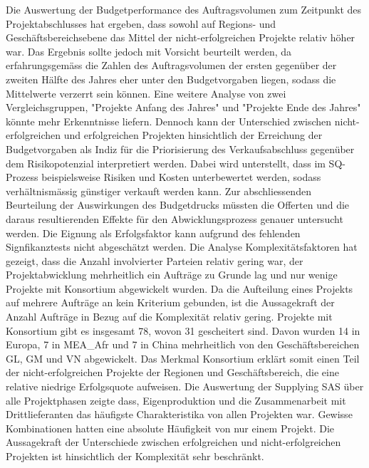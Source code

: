 Die Auswertung der Budgetperformance des Auftragsvolumen zum Zeitpunkt des Projektabschlusses hat ergeben, dass sowohl auf Regions- und Geschäftsbereichsebene das Mittel der nicht-erfolgreichen Projekte relativ höher war. Das Ergebnis sollte jedoch mit Vorsicht beurteilt werden, da erfahrungsgemäss die Zahlen des Auftragsvolumen der ersten gegenüber der zweiten Hälfte des Jahres eher unter den Budgetvorgaben liegen, sodass die Mittelwerte verzerrt sein können. Eine weitere Analyse von zwei Vergleichsgruppen, "Projekte Anfang des Jahres" und "Projekte Ende des Jahres" könnte mehr Erkenntnisse liefern. Dennoch kann der Unterschied zwischen nicht-erfolgreichen und erfolgreichen Projekten hinsichtlich der Erreichung der Budgetvorgaben als Indiz für die Priorisierung des Verkaufsabschluss gegenüber dem Risikopotenzial interpretiert werden. Dabei wird unterstellt, dass im SQ-Prozess beispielsweise Risiken und Kosten unterbewertet werden, sodass verhältnismässig günstiger verkauft werden kann. Zur abschliessenden Beurteilung der Auswirkungen des Budgetdrucks müssten die Offerten und die daraus resultierenden Effekte für den Abwicklungsprozess genauer untersucht werden. Die Eignung als Erfolgsfaktor kann aufgrund des fehlenden Signfikanztests nicht abgeschätzt werden.
\newline\newline 
Die Analyse Komplexitätsfaktoren hat gezeigt, dass die Anzahl involvierter Parteien relativ gering war, der Projektabwicklung mehrheitlich ein Aufträge zu Grunde lag und nur wenige Projekte mit Konsortium abgewickelt wurden. Da die Aufteilung eines Projekts auf mehrere Aufträge an kein Kriterium gebunden, ist die Aussagekraft der Anzahl Aufträge in Bezug auf die Komplexität relativ gering. Projekte mit Konsortium gibt es insgesamt 78, wovon 31 gescheitert sind. Davon wurden 14 in Europa, 7 in MEA\_Afr und 7 in China mehrheitlich von den Geschäftsbereichen GL, GM und VN abgewickelt. Das Merkmal Konsortium erklärt somit einen Teil der nicht-erfolgreichen Projekte der Regionen und Geschäftsbereich, die eine relative niedrige Erfolgsquote aufweisen. 
Die Auswertung der Supplying SAS über alle Projektphasen zeigte dass, Eigenproduktion und die Zusammenarbeit mit Drittlieferanten das häufigste Charakteristika von allen Projekten war. Gewisse Kombinationen hatten eine absolute Häufigkeit von nur einem Projekt. Die Aussagekraft der Unterschiede zwischen erfolgreichen und nicht-erfolgreichen Projekten ist hinsichtlich der Komplexität sehr beschränkt.
\newline\newline
